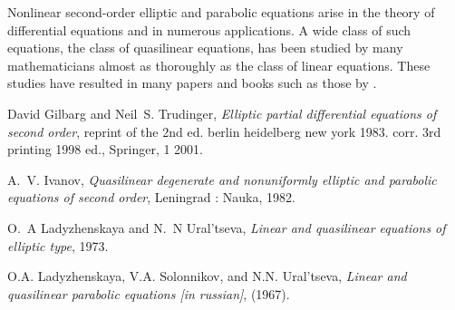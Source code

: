 \documentclass{article}
\begin{document}
Nonlinear second-order elliptic and parabolic equations arise in the theory of differential equations and in numerous applications. A wide class of such equations, the class of quasilinear equations, has been studied by many mathematicians almost as thoroughly as the class of linear equations. These studies have resulted in many papers and books such as those by \cite{ladyzhenskaya1973linear,ladyzhenskaya1967linear,ivanov1982quasi,GilbargTrudinger200101}.



\begin{thebibliography}{1}
David Gilbarg and Neil~S. Trudinger, \emph{Elliptic partial differential equations of second order}, reprint of the 2nd ed. berlin heidelberg new york 1983. corr. 3rd printing 1998 ed., Springer, 1 2001.
  
A.~V. Ivanov, \emph{Quasilinear degenerate and nonuniformly elliptic and parabolic equations of second order}, Leningrad : Nauka, 1982.
  
O.~A Ladyzhenskaya and N.~N Ural'tseva, \emph{Linear and quasilinear equations of elliptic type}, 1973.
  
 O.A. Ladyzhenskaya, V.A. Solonnikov, and N.N. Ural'tseva, \emph{Linear and quasilinear parabolic equations [in russian]},  (1967).
  
\end{thebibliography}
\end{document}
